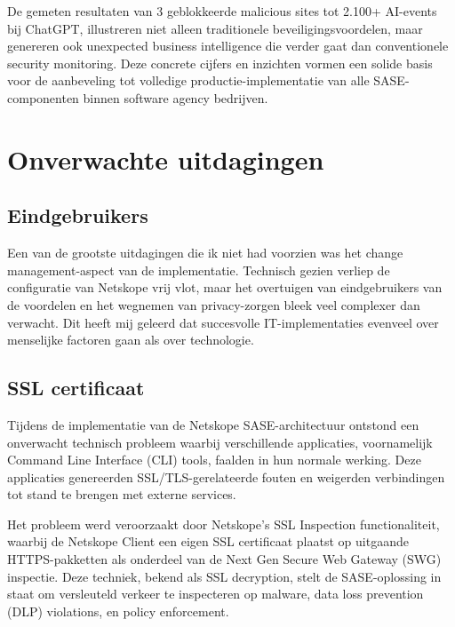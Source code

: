 \vspace{2ex}

De gemeten resultaten van 3 geblokkeerde malicious sites tot 2.100+ AI-events bij ChatGPT, illustreren niet alleen traditionele beveiligingsvoordelen, maar genereren ook unexpected business intelligence die verder gaat dan conventionele security monitoring. Deze concrete cijfers en inzichten vormen een solide basis voor de aanbeveling tot volledige productie-implementatie van alle SASE-componenten binnen software agency bedrijven.

\section{Onverwachte uitdagingen}
\subsection{Eindgebruikers}
Een van de grootste uitdagingen die ik niet had voorzien was het change management-aspect van de implementatie. Technisch gezien verliep de configuratie van Netskope vrij vlot, maar het overtuigen van eindgebruikers van de voordelen en het wegnemen van privacy-zorgen bleek veel complexer dan verwacht. Dit heeft mij geleerd dat succesvolle IT-implementaties evenveel over menselijke factoren gaan als over technologie.

\subsection{SSL certificaat}
Tijdens de implementatie van de Netskope SASE-architectuur ontstond een onverwacht technisch probleem waarbij verschillende applicaties, voornamelijk Command Line Interface (CLI) tools, faalden in hun normale werking. Deze applicaties genereerden SSL/TLS-gerelateerde fouten en weigerden verbindingen tot stand te brengen met externe services.

\vspace{2ex}

Het probleem werd veroorzaakt door Netskope's SSL Inspection functionaliteit, waarbij de Netskope Client een eigen SSL certificaat plaatst op uitgaande HTTPS-pakketten als onderdeel van de Next Gen Secure Web Gateway (SWG) inspectie. Deze techniek, bekend als SSL decryption, stelt de SASE-oplossing in staat om versleuteld verkeer te inspecteren op malware, data loss prevention (DLP) violations, en policy enforcement.

\vspace{2ex}

